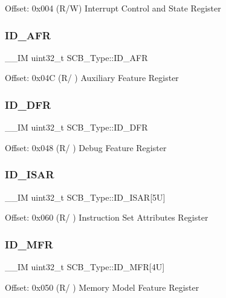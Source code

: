 Offset\+: 0x004 (R/W) Interrupt Control and State Register \mbox{\label{structSCB__Type_a9c9a1d805f8e99b9fd3ab4f455b6333a}} 
\subsubsection{\texorpdfstring{ID\_AFR}{ID\_AFR}}
{\footnotesize\ttfamily \+\_\+\+\_\+\+IM uint32\+\_\+t S\+C\+B\+\_\+\+Type\+::\+I\+D\+\_\+\+A\+FR}

Offset\+: 0x04C (R/ ) Auxiliary Feature Register \mbox{\label{structSCB__Type_ada1d3119c020983fdc949c2ccd406caa}} 
\subsubsection{\texorpdfstring{ID\_DFR}{ID\_DFR}}
{\footnotesize\ttfamily \+\_\+\+\_\+\+IM uint32\+\_\+t S\+C\+B\+\_\+\+Type\+::\+I\+D\+\_\+\+D\+FR}

Offset\+: 0x048 (R/ ) Debug Feature Register \mbox{\label{structSCB__Type_ac729a357cdd968020fdb5c35bdfc4916}} 
\subsubsection{\texorpdfstring{ID\_ISAR}{ID\_ISAR}}
{\footnotesize\ttfamily \+\_\+\+\_\+\+IM uint32\+\_\+t S\+C\+B\+\_\+\+Type\+::\+I\+D\+\_\+\+I\+S\+AR\mbox{[}5\+U\mbox{]}}

Offset\+: 0x060 (R/ ) Instruction Set Attributes Register \mbox{\label{structSCB__Type_a781ef24d88610a432e7d5b179d78de47}} 
\subsubsection{\texorpdfstring{ID\_MFR}{ID\_MFR}}
{\footnotesize\ttfamily \+\_\+\+\_\+\+IM uint32\+\_\+t S\+C\+B\+\_\+\+Type\+::\+I\+D\+\_\+\+M\+FR\mbox{[}4\+U\mbox{]}}

Offset\+: 0x050 (R/ ) Memory Model Feature Register \mbox{\label{structSCB__Type_ab35c6b650d3bb2d11259c0a0285d0d00}} 
